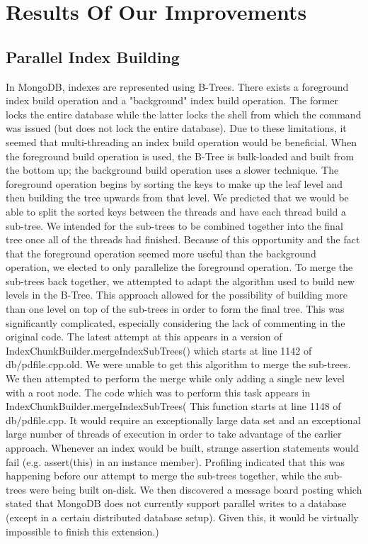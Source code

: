 \documentclass{../dependencies/acm_proc_article-sp}
\begin{document}
\section{Results Of Our Improvements}
\subsection{Parallel Index Building}
In MongoDB, indexes are represented using B-Trees.
There exists a foreground index build operation and a "background" index build operation.
The former locks the entire database while the latter locks the shell from which the command was issued (but does not lock the entire database).
Due to these limitations, it seemed that multi-threading an index build operation would be beneficial.
When the foreground build operation is used, the B-Tree is bulk-loaded and built from the bottom up; the background build operation uses a slower technique\cite{1}.
The foreground operation begins by sorting the keys to make up the leaf level and then building the tree upwards from that level.
We predicted that we would be able to split the sorted keys between the threads and have each thread build a sub-tree.
We intended for the sub-trees to be combined together into the final tree once all of the threads had finished.
Because of this opportunity and the fact that the foreground operation seemed more useful than the background operation, we elected to only parallelize the foreground operation.
To merge the sub-trees back together, we attempted to adapt the algorithm used to build new levels in the B-Tree.
This approach allowed for the possibility of building more than one level on top of the sub-trees in order to form the final tree.
This was significantly complicated, especially considering the lack of commenting in the original code.
The latest attempt at this appears in a version of IndexChunkBuilder.mergeIndexSubTrees() which starts at line 1142 of db/pdfile.cpp.old.
We were unable to get this algorithm to merge the sub-trees.
We then attempted to perform the merge while only adding a single new level with a root node.
The code which was to perform this task appears in IndexChunkBuilder.mergeIndexSubTrees( This function starts at line 1148 of db/pdfile.cpp.
It would require an exceptionally large data set and an exceptional large number of threads of execution in order to take advantage of the earlier approach.
Whenever an index would be built, strange assertion statements would fail (e.g. assert(this) in an instance member).
Profiling indicated that this was happening before our attempt to merge the sub-trees together, while the sub-trees were being built on-disk.
We then discovered a message board posting which stated that MongoDB does not currently support parallel writes to a database\cite{2} (except in a certain distributed database setup)\cite{3}.
Given this, it would be virtually impossible to finish this extension.)
\end{document}
